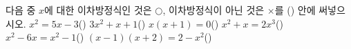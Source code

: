 다음 중 $x$에 대한 이차방정식인 것은 $\bigcirc$, 이차방정식이 아닌 것은 $\times$를 (\quad) 안에 써넣으시오.
 $x^2=5x-3$\hfill(\qquad)
 $3x^2+x+1$\hfill(\qquad)
 $x(x+1)=0$\hfill(\qquad)
 $x^2+x=2x^3$\hfill(\qquad)
 $x^2-6x=x^2-1$\hfill(\qquad)
 $(x-1)(x+2)=2-x^2$\hfill(\qquad)
